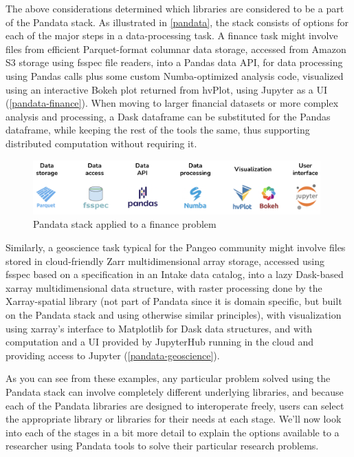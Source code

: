 The above considerations determined which libraries are considered to be a part of the Pandata stack. As illustrated in \autoref{pandata}, the stack consists of options for each of the major steps in a data-processing task. A finance task might involve files from efficient Parquet-format columnar data storage, accessed from Amazon S3 storage using fsspec file readers, into a Pandas data API, for data processing using Pandas calls plus some custom Numba-optimized analysis code, visualized using an interactive Bokeh plot returned from hvPlot, using Jupyter as a UI (\autoref{pandata-finance}). When moving to larger financial datasets or more complex analysis and processing, a Dask dataframe can be substituted for the Pandas dataframe, while keeping the rest of the tools the same, thus supporting distributed computation without requiring it.
\begin{figure}[h]
    \includegraphics[width=0.987\textwidth]{pandata-finance.png}
    \caption{Pandata stack applied to a finance problem}
    \label{pandata-finance}
\end{figure}
Similarly, a geoscience task typical for the Pangeo community might involve files stored in cloud-friendly Zarr multidimensional array storage, accessed using fsspec based on a specification in an Intake data catalog, into a lazy Dask-based xarray multidimensional data structure, with raster processing done by the Xarray-spatial library (not part of Pandata since it is domain specific, but built on the Pandata stack and using otherwise similar principles), with visualization using xarray's interface to Matplotlib for Dask data structures, and with computation and a UI provided by JupyterHub running in the cloud and providing access to Jupyter (\autoref{pandata-geoscience}).

As you can see from these examples, any particular problem solved using the Pandata stack can involve completely different underlying libraries, and because each of the Pandata libraries are designed to interoperate freely, users can select the appropriate library or libraries for their needs at each stage. We'll now look into each of the stages in a bit more detail to explain the options available to a researcher using Pandata tools to solve their particular research problems.


